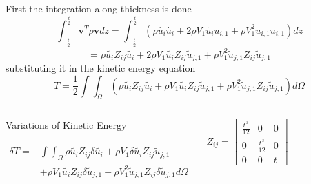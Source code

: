\documentclass[9pt]{beamer}
\begin{document}
\begin{frame}
First the integration along thickness is done
\begin{equation*}
\int_{-\frac{t}{2}}^{\frac{t}{2}} \mathbf{v}^T\rho\mathbf{v} dz =
\int_{-\frac{t}{2}}^{\frac{t}{2}}
\left(
\rho\dot{u_i}\dot{u_i}
+
2 \rho V_1 \dot{u_i} u_{i,1}
+
\rho V_1^2 u_{i,1} u_{i,1}
\right) dz
\end{equation*}
\begin{equation*}
 =
\rho \dot{\tilde{u_i}} Z_{ij} \dot{\tilde{u_i}}
+
2 \rho V_1 \dot{\tilde{u_i}} Z_{ij} \tilde{u}_{j,1} 
+
\rho V_1^2 \tilde{u}_{j,1} Z_{ij} \tilde{u}_{j,1}
\end{equation*}
substituting it in the kinetic energy equation
\begin{equation*}
T = \frac{1}{2} \int \int_\Omega \left(
\rho \dot{\tilde{u_i}} Z_{ij} \dot{\tilde{u_i}}
+
\rho V_1 \dot{\tilde{u_i}} Z_{ij} \tilde{u}_{j,1} 
+
\rho V_1^2 \tilde{u}_{j,1} Z_{ij} \tilde{u}_{j,1}
 \right) d\Omega
\end{equation*}
\begin{columns}
\begin{block}{Variations of Kinetic Energy}


\begin{equation*}
\begin{split}
\delta T = & \int \int_\Omega 
\rho \dot{\tilde{u_i}} Z_{ij} \delta \dot{\tilde{u_i}}
+
\rho V_1 \delta \dot{\tilde{u_i}} Z_{ij} \tilde{u}_{j,1} \\ &
  +  
\rho V_1  \dot{\tilde{u_i}} Z_{ij} \delta \tilde{u}_{j,1} 
+
\rho V_1^2 \tilde{u}_{j,1} Z_{ij} \delta \tilde{u}_{j,1}
 d\Omega
\end{split}
\end{equation*}

\end{block}

\begin{equation*}
Z_{ij}=
\begin{bmatrix}
\frac{t^3}{12} & 0 & 0 \\
0 & \frac{t^3}{12} &  0 \\
0 &   0 & t 
\end{bmatrix}
\end{equation*}
\end{columns}

\end{frame}
\end{document}
